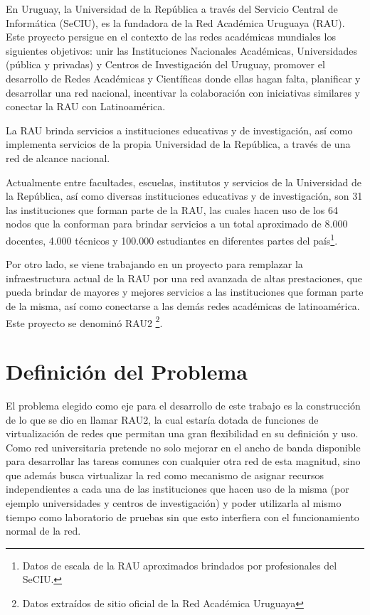 En Uruguay, la Universidad de la República a través del Servicio Central de Informática (SeCIU), es la fundadora de la Red Académica Uruguaya (RAU). Este proyecto persigue en el contexto de las redes académicas mundiales los siguientes objetivos: unir las Instituciones Nacionales Académicas, Universidades (pública y privadas) y Centros de Investigación del Uruguay, promover el desarrollo de Redes Académicas y Científicas donde ellas hagan falta, planificar y desarrollar una red nacional, incentivar la colaboración con iniciativas similares y conectar la RAU con Latinoamérica. 

La RAU brinda servicios a instituciones educativas y de investigación, as\'i como implementa servicios de la propia Universidad de la República, a trav\'es de una red de alcance nacional.

Actualmente entre facultades, escuelas, institutos y servicios de la Universidad de la República, así como diversas instituciones educativas y de investigación, son 31 las instituciones que forman parte de la RAU, las cuales hacen uso de los 64 nodos que la conforman para brindar servicios a un total aproximado de 8.000 docentes, 4.000 técnicos y 100.000 estudiantes en diferentes partes del país\footnote{Datos de escala de la RAU aproximados brindados por profesionales del SeCIU.}.

Por otro lado, se viene trabajando en un proyecto para remplazar la infraestructura actual de la RAU por una red avanzada de altas prestaciones, que pueda brindar de mayores y mejores servicios a las instituciones que forman parte de la misma, así como conectarse a las demás redes académicas de latinoam\'erica. Este proyecto se denomin\'o RAU2 \footnote{Datos extraídos de sitio oficial de la Red Académica Uruguaya\cite{RedRAU}}.  

\section{Definición del Problema}

El problema elegido como eje para el desarrollo de este trabajo es la 
construcción de lo que se dio en llamar RAU2, la cual estaría dotada de funciones de virtualización de redes que permitan una gran flexibilidad en su definición y uso. Como red universitaria pretende no solo mejorar en el ancho de banda disponible para desarrollar las tareas comunes con cualquier otra red de esta magnitud, sino que además busca virtualizar la red como mecanismo de asignar recursos independientes a cada una de las instituciones que hacen uso de la misma (por ejemplo universidades y centros de investigación) y poder utilizarla al mismo tiempo como laboratorio de pruebas sin que esto interfiera con el funcionamiento normal de la red.\\

